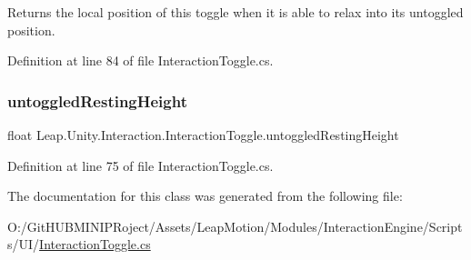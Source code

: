 Returns the local position of this toggle when it is able to relax into its untoggled position. 



Definition at line 84 of file Interaction\+Toggle.\+cs.

\mbox{\label{class_leap_1_1_unity_1_1_interaction_1_1_interaction_toggle_aef60cd4161e0cecc20905b5b610a8ab7}} 
\subsubsection{\texorpdfstring{untoggledRestingHeight}{untoggledRestingHeight}}
{\footnotesize\ttfamily float Leap.\+Unity.\+Interaction.\+Interaction\+Toggle.\+untoggled\+Resting\+Height\hspace{0.3cm}{\ttfamily [get]}}



Definition at line 75 of file Interaction\+Toggle.\+cs.



The documentation for this class was generated from the following file\+:\begin{DoxyCompactItemize}
\item 
O\+:/\+Git\+H\+U\+B\+M\+I\+N\+I\+P\+Roject/\+Assets/\+Leap\+Motion/\+Modules/\+Interaction\+Engine/\+Scripts/\+U\+I/\mbox{\hyperlink{_interaction_toggle_8cs}{Interaction\+Toggle.\+cs}}\end{DoxyCompactItemize}
